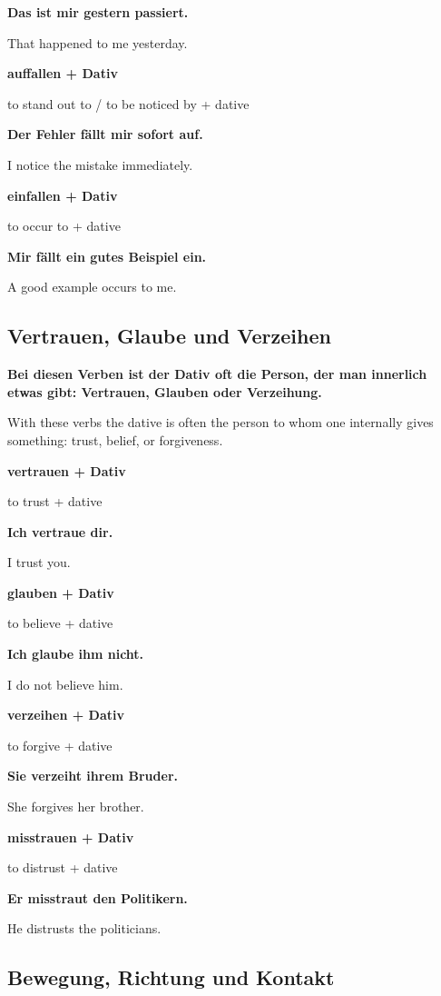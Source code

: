 \documentclass[a4paper]{article}
\newcommand{\EN}[1]{\par{\small\textcolor{TranslationGray}{#1}}\vspace{0.4em}}
\begin{document}
            \textbf{Das ist mir gestern passiert.}
            \EN{That happened to me yesterday.}
            
            \textbf{auffallen + Dativ}
            \EN{to stand out to / to be noticed by + dative}
            
            \textbf{Der Fehler fällt mir sofort auf.}
            \EN{I notice the mistake immediately.}
            
            \textbf{einfallen + Dativ}
            \EN{to occur to + dative}
            
            \textbf{Mir fällt ein gutes Beispiel ein.}
            \EN{A good example occurs to me.}
        
        \subsection{Vertrauen, Glaube und Verzeihen}
            
            \textbf{Bei diesen Verben ist der Dativ oft die Person, der man innerlich etwas gibt: Vertrauen, Glauben oder Verzeihung.}
            \EN{With these verbs the dative is often the person to whom one internally gives something: trust, belief, or forgiveness.}
            
            \textbf{vertrauen + Dativ}
            \EN{to trust + dative}
            
            \textbf{Ich vertraue dir.}
            \EN{I trust you.}
            
            \textbf{glauben + Dativ}
            \EN{to believe + dative}
            
            \textbf{Ich glaube ihm nicht.}
            \EN{I do not believe him.}
            
            \textbf{verzeihen + Dativ}
            \EN{to forgive + dative}
            
            \textbf{Sie verzeiht ihrem Bruder.}
            \EN{She forgives her brother.}
            
            \textbf{misstrauen + Dativ}
            \EN{to distrust + dative}
            
            \textbf{Er misstraut den Politikern.}
            \EN{He distrusts the politicians.}
        
        \subsection{Bewegung, Richtung und Kontakt}
            
\end{document}

